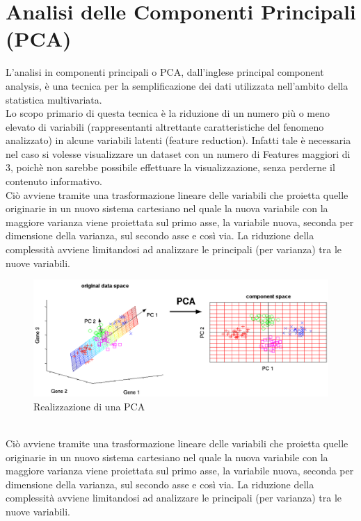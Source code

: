 \documentclass[a4paper, oneside]{book}
\begin{document}
\newpage
\large
\section*{Analisi delle Componenti Principali (PCA)}
L'analisi in componenti principali o PCA, dall'inglese principal component analysis, è una tecnica per la semplificazione dei dati utilizzata nell'ambito della statistica multivariata. \\
Lo scopo primario di questa tecnica è la riduzione di un numero più o meno elevato di variabili (rappresentanti altrettante caratteristiche del fenomeno analizzato) in alcune variabili latenti (feature reduction). Infatti tale è necessaria nel caso si volesse visualizzare un dataset con un numero di Features maggiori di 3, poichè non sarebbe possibile effettuare la visualizzazione, senza perderne il contenuto informativo. \\
Ciò avviene tramite una trasformazione lineare delle variabili che proietta quelle originarie in un nuovo sistema cartesiano nel quale la nuova variabile con la maggiore varianza viene proiettata sul primo asse, la variabile nuova, seconda per dimensione della varianza, sul secondo asse e così via. La riduzione della complessità avviene limitandosi ad analizzare le principali (per varianza) tra le nuove variabili. 
\\
\begin{figure}[htp]
\centering
\includegraphics[width=14cm]{pca.png}
\caption{Realizzazione di una PCA}
\label{fig:pca}
\end{figure}
\\
Ciò avviene tramite una trasformazione lineare delle variabili che proietta quelle originarie in un nuovo sistema cartesiano nel quale la nuova variabile con la maggiore varianza viene proiettata sul primo asse, la variabile nuova, seconda per dimensione della varianza, sul secondo asse e così via.
La riduzione della complessità avviene limitandosi ad analizzare le principali (per varianza) tra le nuove variabili.
\end{document}
